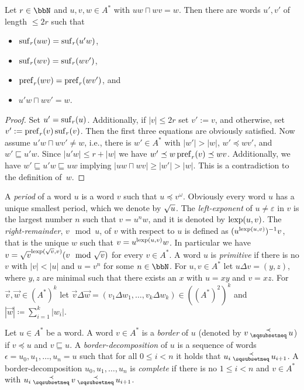 \begin{lemma}\label{lem:short_ends_construction}
	Let $r\in\bbN$ and $u,v,w \in A^\ast$ with $uw\sqcap wv = w$. %
	Then there are words $u',v'$ of length $\leq 2r$ such that
	\begin{itemize}
		\item $\operatorname{suf}_r(uw) = \operatorname{suf}_r(u'w)$,
		\item $\operatorname{suf}_r(wv) = \operatorname{suf}_r(wv')$,
		\item $\operatorname{pref}_r(wv) = \operatorname{pref}_r(wv')$, and
		\item $u'w\sqcap wv' = w$.
	\end{itemize}
\end{lemma}
\begin{proof}
	Set $u'=\operatorname{suf}_r(u)$. Additionally, if $|v|\leq 2r$ set $v':=v$, and otherwise, set $v':=\operatorname{pref}_r(v)\operatorname{suf}_r(v)$. Then the first three equations are obviously satisfied. Now assume $u'w\sqcap wv'\neq w$, i.e., there is $w'\in A^*$ with $|w'|>|w|$, $w'\preceq wv'$, and $w'\sqsubseteq u'w$. Since $|u'w|\leq r+|w|$ we have $w'\preceq w\operatorname{pref}_r(v)\preceq wv$. Additionally, we have $w'\sqsubseteq u'w\sqsubseteq uw$ implying $|uw\sqcap wv|\geq|w'|>|w|$. This is a contradiction to the definition of~$w$.
\end{proof}

A \emph{period} of a word $u$ is a word $v$ such that $u \preceq v^\omega$. Obviously every word $u$ has a unique smallest period, which we denote by $\sqrt{u}$. The \emph{left-exponent} of $u\neq\varepsilon$ in $v$ is the largest number $n$ such that $v= u^nw$, and it is denoted by $\operatorname{lexp}(u,v)$. The \emph{right-remainder}, $v\mod u$,  of $v$ with respect to $u$ is defined as $(u^{\operatorname{lexp}(u,v)})^{-1}v$, that is the unique $w$ such that $v= u^{\operatorname{lexp}(u,v)}w$.  In particular we have $v= \root{v}^{\lexp(\root{v}, v)}(v \mod \root{v})$ for every $v\in A^\ast$. A word $u$ is \emph{primitive} if there is no $v$ with
$|v| < |u|$ and $u = v^n$ for some $n\in\bbN$.
For $u,v\in A^\ast$ let $u\Delta v = (y,z)$, where $y,z$ are minimal such that there exists an $x$ with $u=xy$ and $v=xz$. For $\vec{v}, \vec{w}\in(A^\ast)^k$ let 
$\vec{v}\Delta\vec{w} = (v_1\Delta w_1,\ldots, v_k\Delta w_k) \in ((A^\ast)^2)^k$ and $|\vec{w}| \coloneq \sum_{i=1}^{k}|w_i|$. 

\begin{definition}
	Let $u\in A^\ast$ be a word. A word $v\in A^*$ is a \emph{border} of $u$ (denoted by $v\presuf u$) if $v \preceq u$ and $v \sqsubseteq u$. A \emph{border-decomposition} of $u$ is a sequence of words $\epsilon = u_0,u_1,\ldots, u_n = u$ such that for all $0\leq i < n$ it holds that
	$u_i \presuf u_{i+1}$. A border-decomposition $u_0,u_1,\ldots, u_n $ is \emph{complete} if there is no $1\leq i< n$ and $v\in A^\ast$ with $u_i \presuf v \presuf u_{i+1}$.
\end{definition}

